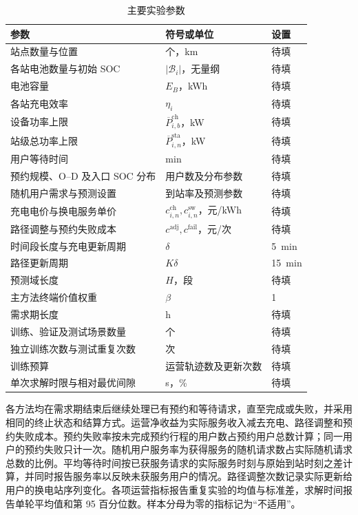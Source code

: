 \documentclass[12pt,a4paper,UTF8]{ctexart}
\numberwithin{equation}{section}
\begin{document}
\begin{table}[!htbp]
  \centering
  \caption{主要实验参数}
  \label{exp:parameters}
  \small
  \setlength{\tabcolsep}{5pt}
  \begin{tabularx}{\linewidth}{@{}Xll@{}}
    \toprule
    参数 & 符号或单位 & 设置 \\
    \midrule
    站点数量与位置 & 个，km & 待填 \\
    各站电池数量与初始 SOC & $|\mathcal B_i|$，无量纲 & 待填 \\
    电池容量 & $E_B$，kWh & 待填 \\
    各站充电效率 & $\eta_i$ & 待填 \\
    设备功率上限 & $\overline P_{i,b}^{\mathrm{ch}}$，kW & 待填 \\
    站级总功率上限 & $\overline P_{i,n}^{\mathrm{sta}}$，kW & 待填 \\
    用户等待时间 & min & 待填 \\
    预约规模、O--D 及入口 SOC 分布 & 用户数及分布参数 & 待填 \\
    随机用户需求与预测设置 & 到站率及预测参数 & 待填 \\
    充电电价与换电服务单价 & $c_{i,n}^{\mathrm{ch}},c_{i,n}^{\mathrm{sw}}$，元/kWh & 待填 \\
    路径调整与预约失败成本 & $c^{\mathrm{adj}},c^{\mathrm{fail}}$，元/次 & 待填 \\
    时间段长度与充电更新周期 & $\delta$ & 5~min \\
    路径更新周期 & $K\delta$ & 15~min \\
    预测域长度 & $H$，段 & 待填 \\
    主方法终端价值权重 & $\beta$ & 1 \\
    需求期长度 & h & 待填 \\
    训练、验证及测试场景数量 & 个 & 待填 \\
    独立训练次数与测试重复次数 & 次 & 待填 \\
    训练预算 & 运营轨迹数及更新次数 & 待填 \\
    单次求解时限与相对最优间隙 & s，\% & 待填 \\
    \bottomrule
  \end{tabularx}
\end{table}

各方法均在需求期结束后继续处理已有预约和等待请求，直至完成或失败，并采用相同的终止状态和结算方式。运营净收益为实际服务收入减去充电、路径调整和预约失败成本。预约失败率按未完成预约行程的用户数占预约用户总数计算；同一用户的预约失败只计一次。随机用户服务率为获得服务的随机请求数占实际随机请求总数的比例。平均等待时间按已获服务请求的实际服务时刻与原始到站时刻之差计算，并同时报告服务率以反映未获服务用户的情况。路径调整次数记录实际更新给用户的换电站序列变化。各项运营指标报告重复实验的均值与标准差，求解时间报告单轮平均值和第 95 百分位数。样本分母为零的指标记为“不适用”。
\end{document}
